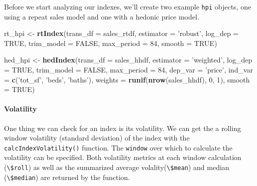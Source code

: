 \documentclass[]{article}
\newenvironment{Shaded}{\begin{snugshade}}{\end{snugshade}}
\newcommand{\KeywordTok}[1]{\textcolor[rgb]{0.13,0.29,0.53}{\textbf{#1}}}
\newcommand{\DataTypeTok}[1]{\textcolor[rgb]{0.13,0.29,0.53}{#1}}
\newcommand{\DecValTok}[1]{\textcolor[rgb]{0.00,0.00,0.81}{#1}}
\newcommand{\StringTok}[1]{\textcolor[rgb]{0.31,0.60,0.02}{#1}}
\newcommand{\OtherTok}[1]{\textcolor[rgb]{0.56,0.35,0.01}{#1}}
\newcommand{\NormalTok}[1]{#1}
\let\oldparagraph\paragraph
\renewcommand{\paragraph}[1]{\oldparagraph{#1}\mbox{}}
\begin{document}
Before we start analyzing our indexes, we'll create two example
\texttt{hpi} objects, one using a repeat sales model and one with a
hedonic price model.

\begin{Shaded}
\begin{Highlighting}[]
\NormalTok{  rt_hpi <-}\StringTok{ }\KeywordTok{rtIndex}\NormalTok{(}\DataTypeTok{trans_df =}\NormalTok{ sales_rtdf,}
                    \DataTypeTok{estimator =} \StringTok{'robust'}\NormalTok{,}
                    \DataTypeTok{log_dep =} \OtherTok{TRUE}\NormalTok{,}
                    \DataTypeTok{trim_model =} \OtherTok{FALSE}\NormalTok{,}
                    \DataTypeTok{max_period =} \DecValTok{84}\NormalTok{,}
                    \DataTypeTok{smooth =} \OtherTok{TRUE}\NormalTok{)}

\NormalTok{  hed_hpi <-}\StringTok{ }\KeywordTok{hedIndex}\NormalTok{(}\DataTypeTok{trans_df =}\NormalTok{ sales_hhdf,}
                      \DataTypeTok{estimator =} \StringTok{'weighted'}\NormalTok{,}
                      \DataTypeTok{log_dep =} \OtherTok{TRUE}\NormalTok{,}
                      \DataTypeTok{trim_model =} \OtherTok{FALSE}\NormalTok{,}
                      \DataTypeTok{max_period =} \DecValTok{84}\NormalTok{,}
                      \DataTypeTok{dep_var =} \StringTok{'price'}\NormalTok{,}
                      \DataTypeTok{ind_var =} \KeywordTok{c}\NormalTok{(}\StringTok{'tot_sf'}\NormalTok{, }\StringTok{'beds'}\NormalTok{, }\StringTok{'baths'}\NormalTok{),}
                      \DataTypeTok{weights =} \KeywordTok{runif}\NormalTok{(}\KeywordTok{nrow}\NormalTok{(sales_hhdf), }\DecValTok{0}\NormalTok{, }\DecValTok{1}\NormalTok{),}
                      \DataTypeTok{smooth =} \OtherTok{TRUE}\NormalTok{)}
\end{Highlighting}
\end{Shaded}

\paragraph{Volatility}\label{volatility}

One thing we can check for an index is its volatility. We can get the a
rolling window volatility (standard deviation) of the index with the
\texttt{calcIndexVolatility()} function. The \texttt{window} over which
to calculate the volatility can be specified. Both volatility metrics at
each window calculation (\texttt{\textbackslash{}\$roll}) as well as the
summarized average volality(\texttt{\textbackslash{}\$mean}) and median
(\texttt{\textbackslash{}\$median}) are returned by the function.
\end{document}
